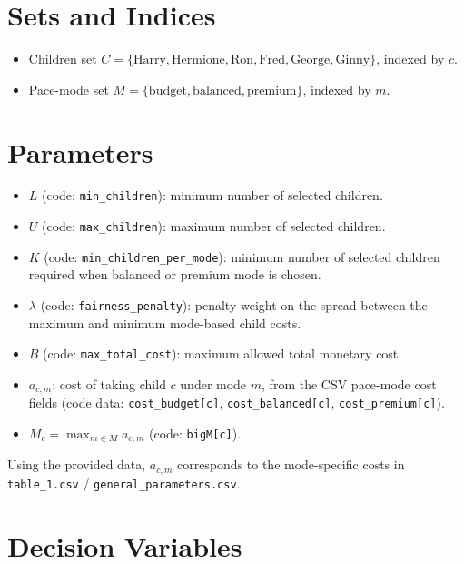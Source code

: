 \section*{Sets and Indices}

\begin{itemize}
    \item Children set \(C=\{\text{Harry},\text{Hermione},\text{Ron},\text{Fred},\text{George},\text{Ginny}\}\), indexed by \(c\).
    \item Pace-mode set \(M=\{\text{budget},\text{balanced},\text{premium}\}\), indexed by \(m\).
\end{itemize}

\section*{Parameters}

\begin{itemize}
    \item \(L\) (code: \texttt{min\_children}): minimum number of selected children.
    \item \(U\) (code: \texttt{max\_children}): maximum number of selected children.
    \item \(K\) (code: \texttt{min\_children\_per\_mode}): minimum number of selected children required when balanced or premium mode is chosen.
    \item \(\lambda\) (code: \texttt{fairness\_penalty}): penalty weight on the spread between the maximum and minimum mode-based child costs.
    \item \(B\) (code: \texttt{max\_total\_cost}): maximum allowed total monetary cost.
    \item \(a_{c,m}\): cost of taking child \(c\) under mode \(m\), from the CSV pace-mode cost fields
    (code data: \texttt{cost\_budget[c]}, \texttt{cost\_balanced[c]}, \texttt{cost\_premium[c]}).
    \item \(M_c=\max_{m\in M} a_{c,m}\) (code: \texttt{bigM[c]}).
\end{itemize}

Using the provided data, \(a_{c,m}\) corresponds to the mode-specific costs in \texttt{table\_1.csv} / \texttt{general\_parameters.csv}.

\section*{Decision Variables}

